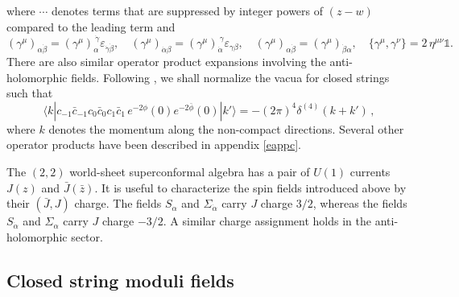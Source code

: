 \documentclass[12pt,a4paper]{article}
\newcommand{\be}{\begin{equation}}
\newcommand{\ee}{\end{equation}}
\newcommand{\ve}{\varepsilon}
\def\bz{\bar z}
\newcommand{\dalpha}{\beta}
\def\dalpha{{\dot\alpha}}
\def\dbeta{{\dot\beta}}
\def\dgamma{{\dot\gamma}}
\begin{document}
where $\cdots$ denotes terms that are suppressed by integer powers of $(z-w)$ compared
to the leading term and
\be
(\gamma^\mu)_{\alpha\dbeta}= (\gamma^\mu)_{\alpha}^{~\dgamma} \ve_{\dgamma\dbeta},
\quad
(\gamma^\mu)_{\dalpha\beta}= (\gamma^\mu)_{\dalpha}^{~\gamma} \ve_{\gamma\beta},
\quad
(\gamma^\mu)_{\alpha\dbeta}=(\gamma^\mu)_{\dbeta\alpha},
\quad
\{\gamma^\mu, \gamma^\nu\}=2\, \eta^{\mu\nu} {\mathds 1} .
\ee
There are also similar operator product expansions involving the anti-holomorphic fields.
Following \cite{Sen:2021tpp,Alexandrov:2021shf,Alexandrov:2021dyl},
we shall normalize the vacua for closed strings such that
\be\label{eclosednorm}
\langle k| c_{-1}\bar c_{-1} c_0\bar c_0 c_1 \bar c_1\, e^{-2\phi}(0) e^{-2\bar\phi}(0)|k'\rangle=
- (2\pi)^{4}\delta^{(4)}(k+k')\, ,
\ee
where $k$ denotes the momentum along the non-compact directions.
Several other operator products  have been described in
appendix \ref{eappc}.

The $(2,2)$ world-sheet superconformal algebra has a pair of $U(1)$ currents $J(z)$ and
$\bar J(\bz)$. It is useful to characterize the spin fields introduced above by their $(\bar J, J)$
charge. The fields $S_\alpha$ and $\Sigma_\dalpha$ carry $J$ charge $3/2$, whereas the fields
$S_\dalpha$ and $\Sigma_\alpha$ carry $J$ charge $-3/2$. A similar charge assignment holds
in the anti-holomorphic sector.

\subsection{Closed string moduli fields}
\end{document}
